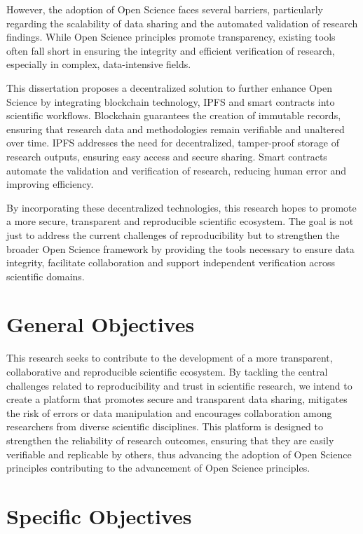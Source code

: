 \documentclass{article}
\begin{document}
However, the adoption of Open Science faces several barriers, particularly regarding the scalability of data sharing and the automated validation of research findings. While Open Science principles promote transparency, existing tools often fall short in ensuring the integrity and efficient verification of research, especially in complex, data-intensive fields.

This dissertation proposes a decentralized solution to further enhance Open Science by integrating blockchain technology, IPFS and smart contracts into scientific workflows. Blockchain guarantees the creation of immutable records, ensuring that research data and methodologies remain verifiable and unaltered over time. IPFS addresses the need for decentralized, tamper-proof storage of research outputs, ensuring easy access and secure sharing. Smart contracts automate the validation and verification of research, reducing human error and improving efficiency.

By incorporating these decentralized technologies, this research hopes to promote a more secure, transparent and reproducible scientific ecosystem. The goal is not just to address the current challenges of reproducibility but to strengthen the broader Open Science framework by providing the tools necessary to ensure data integrity, facilitate collaboration and support independent verification across scientific domains.

\section{General Objectives}

This research seeks to contribute to the development of a more transparent, collaborative and reproducible scientific ecosystem. By tackling the central challenges related to reproducibility and trust in scientific research, we intend to create a platform that promotes secure and transparent data sharing, mitigates the risk of errors or data manipulation and encourages collaboration among researchers from diverse scientific disciplines. This platform is designed to strengthen the reliability of research outcomes, ensuring that they are easily verifiable and replicable by others, thus advancing the adoption of Open Science principles contributing to the advancement of Open Science principles.

\section{Specific Objectives}
\end{document}
